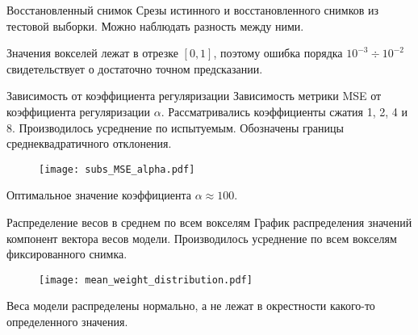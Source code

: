 \documentclass{beamer}
\begin{document}
\begin{frame}{Восстановленный снимок}
    Срезы истинного и восстановленного снимков из тестовой выборки.
    Можно наблюдать разность между ними.
    \begin{figure}[h!]
		\centering
		\hfill
		\hfill
		\label{fig:4}
	\end{figure}
    Значения вокселей лежат в отрезке $[0, 1]$, поэтому ошибка порядка $10^{-3} \div 10^{-2}$
    свидетельствует о достаточно точном предсказании.
\end{frame}
\begin{frame}{Зависимость от коэффициента регуляризации}
    Зависимость метрики MSE от коэффициента регуляризации $\alpha$.
    Рассматривались коэффициенты сжатия 1, 2, 4 и 8.
    Производилось усреднение по испытуемым.
	Обозначены границы среднеквадратичного отклонения.
    \begin{figure}[h!]
		\centering
		\texttt{[image: subs\_MSE\_alpha.pdf]}
		\label{fig:5}
	\end{figure}
    Оптимальное значение коэффициента $\alpha \approx 100$.
\end{frame}
\begin{frame}{Распределение весов в среднем по всем вокселям}
    График распределения значений компонент вектора весов модели.
    Производилось усреднение по всем вокселям фиксированного снимка.
    \begin{figure}[h!]
		\centering
		\texttt{[image: mean\_weight\_distribution.pdf]}
		\label{fig:6}
	\end{figure}
    Веса модели распределены нормально, а не лежат в окрестности какого-то определенного
    значения.
\end{frame}
\end{document}
